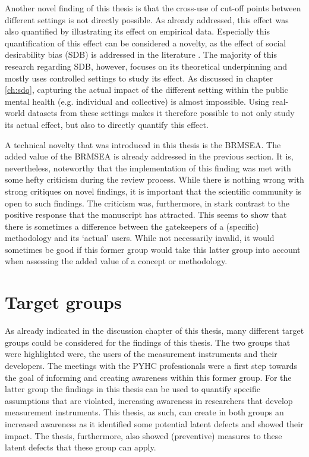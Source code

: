 Another novel finding of this thesis is that the cross-use of cut-off points between different settings is not directly possible. As already addressed, this effect was also quantified by illustrating its effect on empirical data. Especially this quantification of this effect can be considered a novelty, as the effect of social desirability bias (SDB) is addressed in the literature \parencite{Krumpal_2013}. The majority of this research regarding SDB, however, focuses on its theoretical underpinning and mostly uses controlled settings to study its effect. As discussed in chapter \ref{ch:sdq}, capturing the actual impact of the different setting within the public mental health (e.g. individual and collective) is almost impossible. Using real-world datasets from these settings makes it therefore possible to not only study its actual effect, but also to directly quantify this effect. 

A technical novelty that was introduced in this thesis is the BRMSEA. The added value of the BRMSEA is already addressed in the previous section. It is, nevertheless, noteworthy that the implementation of this finding was met with some hefty criticism during the review process. While there is nothing wrong with strong critiques on novel findings, it is important that the scientific community is open to such findings. The criticism was, furthermore, in stark contrast to the positive response that the manuscript has attracted. This seems to show that there is sometimes a difference between the gatekeepers of a (specific) methodology and its `actual' users. While not necessarily invalid, it would sometimes be good if this former group would take this latter group into account when assessing the added value of a concept or methodology.

\section*{Target groups}
As already indicated in the discussion chapter of this thesis, many different target groups could be considered for the findings of this thesis. The two groups that were highlighted were, the users of the measurement instruments and their developers. The meetings with the PYHC professionals were a first step towards the goal of informing and creating awareness within this former group. For the latter group the findings in this thesis can be used to quantify specific assumptions that are violated, increasing awareness in researchers that develop measurement instruments. This thesis, as such, can create in both groups an increased awareness as it identified some potential latent defects and showed their impact. The thesis, furthermore, also showed (preventive) measures to these latent defects that these group can apply.  

